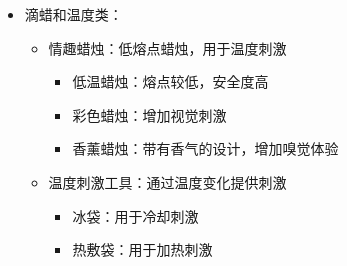 \documentclass[12pt,UTF8]{ctexbook}
\begin{document}
\begin{itemize}
\begin{itemize}
		\begin{itemize}
			\item 性感内衣：增加视觉刺激
			\begin{itemize}
				\item 蕾丝内衣：经典的蕾丝材质，增加女性魅力
				\item 缎面内衣：光滑的缎面材质，质感高级
				\item 透视内衣：半透明设计，增加神秘感
				\item 情趣内衣套装：包括内衣、内裤、吊袜带等
			\end{itemize}
			\item 角色扮演服装：满足性幻想
			\begin{itemize}
				\item 护士装：经典的角色扮演服装
				\item 教师装：展现权威感的角色扮演
				\item 学生装：青春活力的角色扮演
				\item 女仆装：展现温柔服从的角色扮演
				\item 警察装：展现权威和力量的角色扮演
				\item 性感制服：其他职业的性感制服设计
			\end{itemize}
			\item 情趣配饰：增加情趣和视觉刺激
			\begin{itemize}
				\item 吊袜带：经典的情趣配饰
				\item 长筒袜：增加女性腿部魅力
				\item 手套：丝质或皮革手套，增加触感
				\item 面具：增加神秘感的面具设计
			\end{itemize}
		\end{itemize}
		\item 滴蜡和温度类：
		\begin{itemize}
			\item 情趣蜡烛：低熔点蜡烛，用于温度刺激
			\begin{itemize}
				\item 低温蜡烛：熔点较低，安全度高
				\item 彩色蜡烛：增加视觉刺激
				\item 香薰蜡烛：带有香气的设计，增加嗅觉体验
			\end{itemize}
			\item 温度刺激工具：通过温度变化提供刺激
			\begin{itemize}
				\item 冰袋：用于冷却刺激
				\item 热敷袋：用于加热刺激

\end{itemize}
\end{itemize}
\end{itemize}
\end{itemize}
\end{document}
